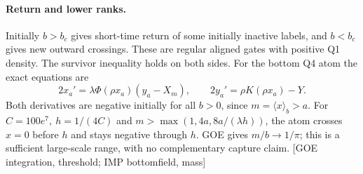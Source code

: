 \documentclass[11pt]{article}
\newcommand{\src}[1]{\textnormal{\small[#1]}}
\begin{document}
\paragraph{Return and lower ranks.}
Initially \(b>b_c\) gives short-time return of some initially
inactive labels, and \(b<b_c\) gives new outward crossings. These are
regular aligned gates with positive Q1 density. The survivor inequality
holds on both sides. For the bottom Q4 atom the exact equations are
\[
 2x_a'=\lambda\Phi(\rho x_a)(y_a-X_m),\qquad
 2y_a'=\rho K(\rho x_a)-Y .
\]
Both derivatives are negative initially for all \(b>0\), since
\(m=\langle x\rangle_b>a\). For \(C=100e^7,\ h=1/(4C)\) and
\(m>\max(1,4a,8a/(\lambda h))\), the atom crosses \(x=0\) before
\(h\) and stays negative through \(h\). GOE gives \(m/b\to1/\pi\);
this is a sufficient large-scale range, with no complementary
capture claim. \src{GOE integration, threshold; IMP bottomfield, mass}
\end{document}
